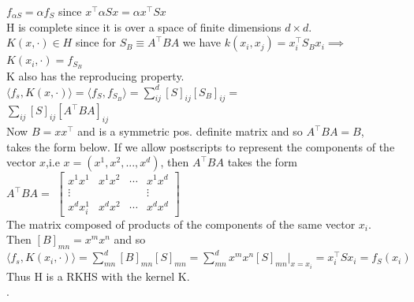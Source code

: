 \documentclass[18pt]{article}
\begin{document}
\begin{flushleft}
$f_{\alpha S}=\alpha f_S$ since $x^{\top}\alpha Sx=\alpha x^{\top} Sx$\\
\vspace{.4cm}
H is complete since it is over a space of finite dimensions $d\times d$.\\
\vspace{.4cm}
$K(x,\cdot) \in H$ since for $S_B \equiv A^{\top}BA$ we have
\vspace{.4cm}
$k(x_i,x_j)=x_i^{\top} S_B x_i \implies$\\
$K(x_i,\cdot)=f_{S_B}$\\
\vspace{.4cm}
K also has the reproducing property.\\
\vspace{.4cm}
$\langle f_s ,K(x,\cdot)\rangle=\langle f_S,f_{S_B}\rangle=\sum\limits_{ij}^d [S]_{ij}[S_B]_{ij}=$\\
$\sum\limits_{ij}[S]_{ij}[A^{\top}BA]_{ij}$\\
\vspace{.4cm}
Now $B=xx^{\top}$ and is a symmetric pos. definite matrix and so $A^{\top}BA=B$,\\
takes the form below. If we allow  postscripts to represent the components of the \\
vector $x$,i.e $x=(x^1,x^2,...,x^d)$, then $A^{\top}BA$ takes the form\\
\vspace{.4cm}
\hspace{2cm} $A^{\top}BA=$
    ${\begin{bmatrix}
    x^1 x^1 & x^1 x^2& \cdots &x^1 x^d\\
    \vdots&          &          &\vdots\\
    x^d x_i^1 & x^d x^2& \cdots &x^d x^d
    \end{bmatrix}}$\\
\vspace{.4cm}
The matrix composed of products of the components of the same vector $x_i$.\\
Then $[B]_{mn}=x^m x^n$ and so\\
\vspace{.4cm}
$\langle f_s ,K(x_i,\cdot)\rangle=\sum\limits_{mn}^d[B]_{mn}[S]_{mn}=\sum\limits_{mn}^d x^m x^n[S]_{mn}\Big|_{x=x_i}=x_i^{\top}Sx_i=f_S(x_i)$\\
\vspace{.4cm}
Thus H is a RKHS with the kernel K.\\
.










\end{flushleft}
\end{document}

